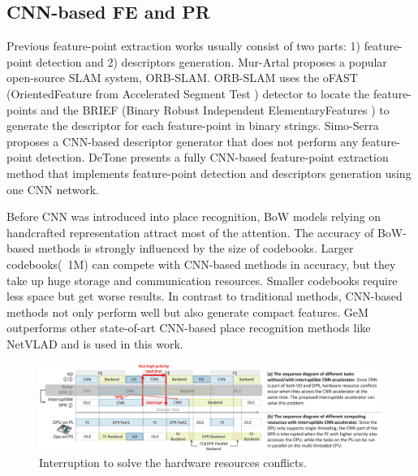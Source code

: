 \label{sec:relate}
\subsection{ CNN-based FE and PR }

Previous feature-point extraction works usually consist of two parts: 1) feature-point detection and 2) descriptors generation.
Mur-Artal \cite{Mur-Artal:2017281} proposes a popular open-source SLAM system, ORB-SLAM. ORB-SLAM uses the oFAST (OrientedFeature from Accelerated Segment Test \cite{biadgie2014feature}) detector to locate the feature-points and the BRIEF (Binary Robust Independent ElementaryFeatures \cite{calonder2010brief}) to generate the descriptor for each feature-point in binary strings. 
Simo-Serra \cite{simo2015discriminative} proposes a CNN-based descriptor generator that does not perform any feature-point detection. 
DeTone \cite{detone2018superpoint} presents a fully CNN-based feature-point extraction method that implements feature-point detection and descriptors generation using one CNN network.

Before CNN was introduced into place recognition, BoW \cite{small_1} models relying on handcrafted representation attract most of the attention. The accuracy of BoW-based methods is strongly influenced by the size of codebooks. Larger codebooks(~1M) \cite{large_1, large_2} can compete with CNN-based methods in accuracy, but they take up huge storage and communication resources. Smaller codebooks\cite{small_1, small_2} require less space but get worse results. In contrast to traditional methods, CNN-based methods not only perform well but also generate compact features. GeM \cite{radenovic2018fine} outperforms other state-of-art CNN-based place recognition methods like NetVLAD \cite{arandjelovic2016netvlad} and is used in this work.

\begin{figure}[t]
	\centering
	\includegraphics[width=0.95\linewidth]{fig/interDPR.eps}
    \caption{Interruption to solve the hardware resources conflicts.  
    }
	\label{fig:interDPR}
\end{figure}

